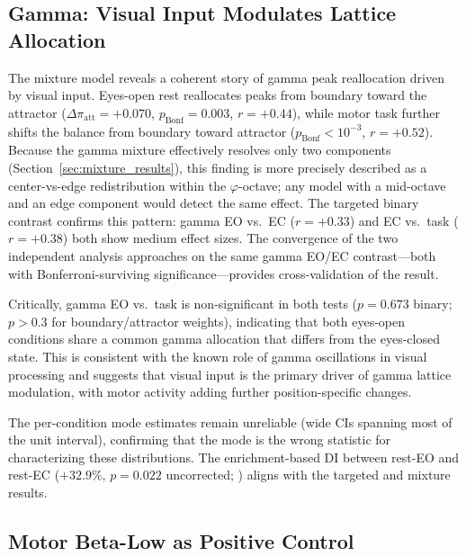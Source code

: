 \documentclass[11pt,a4paper]{article}
\newcommand{\phisym}{\varphi}
\begin{document}
\subsection{Gamma: Visual Input Modulates Lattice Allocation}

The mixture model reveals a coherent story of gamma peak reallocation driven by visual input. Eyes-open rest reallocates peaks from boundary toward the attractor ($\Delta\pi_{\text{att}} = +0.070$, $p_{\text{Bonf}} = 0.003$, $r = +0.44$), while motor task further shifts the balance from boundary toward attractor ($p_{\text{Bonf}} < 10^{-3}$, $r = +0.52$). Because the gamma mixture effectively resolves only two components (Section~\ref{sec:mixture_results}), this finding is more precisely described as a center-vs-edge redistribution within the $\phisym$-octave; any model with a mid-octave and an edge component would detect the same effect. The targeted binary contrast confirms this pattern: gamma EO vs.\ EC ($r = +0.33$) and EC vs.\ task ($r = +0.38$) both show medium effect sizes. The convergence of the two independent analysis approaches on the same gamma EO/EC contrast---both with Bonferroni-surviving significance---provides cross-validation of the result.

Critically, gamma EO vs.\ task is non-significant in both tests ($p = 0.673$ binary; $p > 0.3$ for boundary/attractor weights), indicating that both eyes-open conditions share a common gamma allocation that differs from the eyes-closed state. This is consistent with the known role of gamma oscillations in visual processing \parencite{fries2009neuronal, tallonbaudry1999oscillatory} and suggests that visual input is the primary driver of gamma lattice modulation, with motor activity adding further position-specific changes.

The per-condition mode estimates remain unreliable (wide CIs spanning most of the unit interval), confirming that the mode is the wrong statistic for characterizing these distributions. The enrichment-based DI between rest-EO and rest-EC ($+32.9\%$, $p = 0.022$ uncorrected; \parencite{lacy2026golden}) aligns with the targeted and mixture results.

\subsection{Motor Beta-Low as Positive Control}
\end{document}
